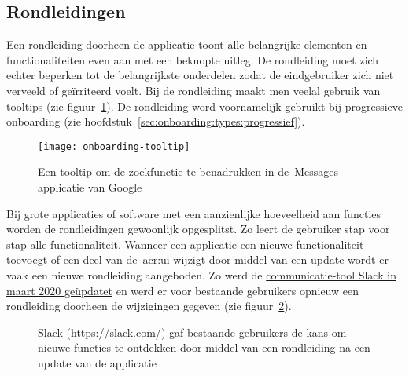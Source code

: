 \subsection{Rondleidingen}
\label{sec:onboarding:rondleidingen}

Een rondleiding doorheen de applicatie toont alle belangrijke elementen en functionaliteiten even aan met een beknopte uitleg. De rondleiding moet zich echter beperken tot de belangrijkste onderdelen zodat de eindgebruiker zich niet verveeld of geïrriteerd voelt. Bij de rondleiding maakt men veelal gebruik van tooltips (zie figuur~\ref{fig:onboarding:rondleiding}). De rondleiding word voornamelijk gebruikt bij progressieve onboarding (zie hoofdstuk~\ref{sec:onboarding:types:progressief}).

\begin{figure}[h!]
    \centering
    \texttt{[image: onboarding-tooltip]}
    \caption[Voorbeeld tooltip]{Een tooltip om de zoekfunctie te benadrukken in de~\href{https://messages.google.com/}{Messages} applicatie van Google}
    \label{fig:onboarding:rondleiding}
\end{figure}

Bij grote applicaties of software met een aanzienlijke hoeveelheid aan functies worden de rondleidingen gewoonlijk opgesplitst. Zo leert de gebruiker stap voor stap alle functionaliteit. Wanneer een applicatie een nieuwe functionaliteit toevoegt of een deel van de~\acrshort{acr:ui} wijzigt door middel van een update wordt er vaak een nieuwe rondleiding aangeboden. Zo werd de \href{https://www.theverge.com/2020/3/18/21184865/slack-redesign-update-sidebar-changes-available-now-download}{communicatie-tool Slack in maart 2020 geüpdatet} en werd er voor bestaande gebruikers opnieuw een rondleiding doorheen de wijzigingen gegeven (zie figuur~\ref{fig:onboarding:rondleiding-slack}).

\begin{figure}[h!]
    \centering
    \qquad
    \caption[Voorbeeld rondleiding Slack]{Slack (\url{https://slack.com/}) gaf bestaande gebruikers de kans om nieuwe functies te ontdekken door middel van een rondleiding na een update van de applicatie}
    \label{fig:onboarding:rondleiding-slack}
\end{figure}

